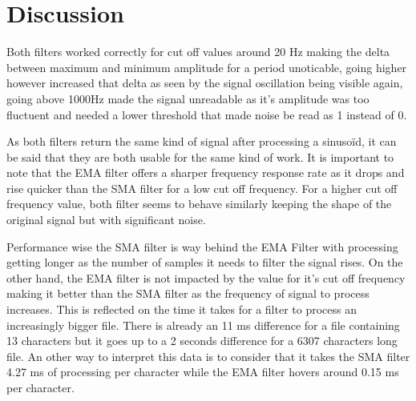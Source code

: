 \chapter{Discussion}

Both filters worked correctly for cut off values around 20 Hz making the delta between maximum and minimum amplitude for a period unoticable, going higher however increased that delta as seen by the signal oscillation being visible again, going above 1000Hz made the signal unreadable as it's amplitude was too fluctuent and needed a lower threshold that made noise be read as 1 instead of 0.

As both filters return the same kind of signal after processing a sinusoïd, it can be said that they are both usable for the same kind of work. It is important to note that the EMA filter offers a sharper frequency response rate as it drops and rise quicker than the SMA filter for a low cut off frequency. For a higher cut off frequency value, both filter seems to behave similarly keeping the shape of the original signal but with significant noise.

Performance wise the SMA filter is way behind the EMA Filter with processing getting longer as the number of samples it needs to filter the signal rises. On the other hand, the EMA filter is not impacted by the value for it's cut off frequency making it better than the SMA filter as the frequency of signal to process increases. This is reflected on the time it takes for a filter to process an increasingly bigger file. There is already an 11 ms difference for a file containing 13 characters but it goes up to a 2 seconds difference for a 6307 characters long file. An other way to interpret this data is to consider that it takes the SMA filter 4.27 ms of processing per character while the EMA filter hovers around 0.15 ms per character.